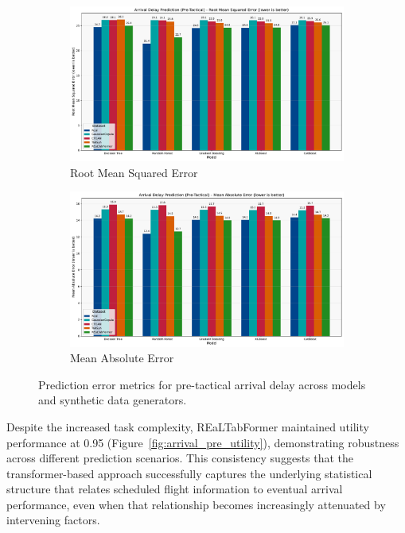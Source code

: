 \documentclass[conference]{IEEEtran}
\begin{document}
\begin{figure}[htbp]
    \centering
    \begin{subfigure}[b]{0.49\textwidth}
        \includegraphics[width=\linewidth]{plots/arrival_delay_min_pre-tactical/arrival_delay_min_pre-tactical_rmse.pdf}
        \caption{Root Mean Squared Error}
        \label{fig:arrival_pre_rmse}
    \end{subfigure}
    \hfill
    \begin{subfigure}[b]{0.49\textwidth}
        \includegraphics[width=\linewidth]{plots/arrival_delay_min_pre-tactical/arrival_delay_min_pre-tactical_mae.pdf}
        \caption{Mean Absolute Error}
        \label{fig:arrival_pre_mae}
    \end{subfigure}
    \caption{Prediction error metrics for pre-tactical arrival delay across models and synthetic data generators.}
\end{figure}

Despite the increased task complexity, REaLTabFormer maintained  utility performance at 0.95 (Figure~\ref{fig:arrival_pre_utility}), demonstrating robustness across different prediction scenarios. This consistency suggests that the transformer-based approach successfully captures the underlying statistical structure that relates scheduled flight information to eventual arrival performance, even when that relationship becomes increasingly attenuated by intervening factors.
\end{document}

